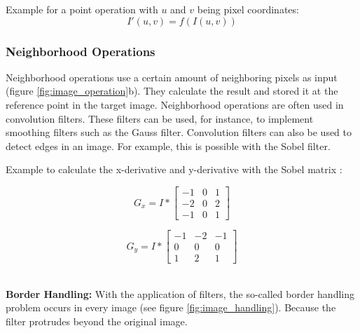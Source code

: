 Example for a point operation with $u$ and $v$ being pixel coordinates:
\begin{equation}
    I'(u, v) = f(I(u, v))
    \label{eq:point_operation}
\end{equation}


\subsubsection*{Neighborhood Operations}
Neighborhood operations use a certain amount of neighboring pixels as input (figure \ref{fig:image_operation}b).
They calculate the result and stored it at the reference point in the target
image. Neighborhood operations are often used in convolution filters. These
filters can be used, for instance, to implement smoothing filters such as the
Gauss filter. Convolution filters can also be used to detect edges in an image. For example, this is possible with the Sobel filter.

Example to calculate the x-derivative and y-derivative with the Sobel matrix \cite{sobel_matrix}:

\noindent\begin{minipage}{.5\linewidth}
\begin{equation}
    G_{x} = I * \begin{bmatrix}
                -1 & 0 & 1 \\ 
                -2 & 0 & 2 \\ 
                -1 & 0 & 1
                \end{bmatrix}
    \label{eq:neighborhood_operation}
\end{equation}

\end{minipage}%
\begin{minipage}{.5\linewidth}

\begin{equation}
    G_{y} = I * \begin{bmatrix}
                -1 & -2 & -1 \\ 
                0 & 0 & 0 \\ 
                1 & 2 & 1
                \end{bmatrix}
    \label{eq:neighborhood_operation}
\end{equation} 

\end{minipage}\\


\textbf{Border Handling:}
With the application of filters, the so-called border handling problem occurs in every image (see figure \ref{fig:image_handling}). Because the filter protrudes beyond the original image.

